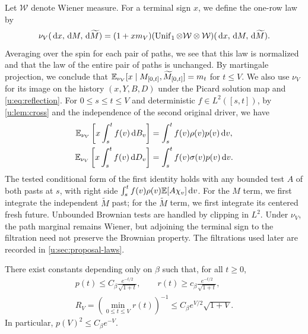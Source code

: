 Let $\mathcal W$ denote Wiener measure. For a terminal sign $x$,
we define the one-row law by
\begin{equation}\label{u:eq:row-law}
 \nu_V(\,\mathrm d x,\,\mathrm d M,\,\mathrm d\widetilde M)
 =(1+x m_V)(\operatorname{Unif}_1\otimes\mathcal W\otimes\mathcal W)
                  (\,\mathrm d x,\,\mathrm d M,\,\mathrm d\widetilde M).
\end{equation}
Averaging over the spin for each pair of paths, we see that this law is
normalized and that the law of the entire pair of paths is unchanged. By martingale projection, we conclude that
$\mathbb E_{\nu_V}[x\mid M_{[0,t]},\widetilde M_{[0,t]}]=m_t$ for
$t\le V$. We also use $\nu_V$ for its image on the history
$(x,Y,B,D)$ under the Picard solution map and \eqref{u:eq:reflection}.
For $0\le s\le t\le V$ and deterministic $f\in L^2([s,t])$,
by \cref{u:lem:cross} and the independence of the second original
driver, we have
\begin{equation}\label{u:eq:row-cross-moments}
\begin{aligned}
 \mathbb E_{\nu_V}\left[x\int_s^t f(v)\,\mathrm d B_v\right]
 &=\int_s^t f(v)\rho(v)p(v)\,\mathrm d v,\\
 \mathbb E_{\nu_V}\left[x\int_s^t f(v)\,\mathrm d D_v\right]
 &=\int_s^t f(v)\sigma(v)p(v)\,\mathrm d v.
\end{aligned}
\end{equation}
The tested conditional form of the first identity holds with any
bounded test $A$ of both pasts at $s$, with right side
$\int_s^t f(v)\rho(v)\mathbb E[A\chi_v]\,\mathrm d v$.
For the $M$ term, we first integrate the independent
$\widetilde M$ past; for the $\widetilde M$ term, we first
integrate its centered fresh future. Unbounded Brownian tests are
handled by clipping in $L^2$. Under $\nu_V$, the path marginal remains
Wiener, but adjoining the terminal sign to the filtration need not
preserve the Brownian property. The filtrations used later are
recorded in \cref{u:sec:proposal-laws}.

\begin{lemma}\label{u:lem:tails}
There exist constants depending only on $\beta$ such that, for all
$t\ge0$,
\begin{equation}\label{u:eq:scalar-tails}
\begin{gathered}
 p(t)\le C_\beta\frac{e^{-t/2}}{\sqrt{1+t}},\qquad
 r(t)\ge c_\beta\frac{e^{-t/2}}{\sqrt{1+t}},\\
 R_V=\left(\min_{0\le t\le V}r(t)\right)^{-1}
 \le C_\beta e^{V/2}\sqrt{1+V}.
\end{gathered}
\end{equation}
In particular, $p(V)^2\le C_\beta e^{-V}$.
\end{lemma}

